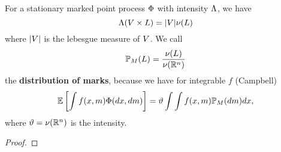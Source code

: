 \begin{lemma}[Campbell]\label{lem: Campbell}
	For a stationary marked point process \(\Phi\) with intensity
	\(\Lambda\), we have	
	\[
		\Lambda(V \times L) = |V|\nu(L)
	\]
	where \(|V|\) is the lebesgue measure of \(V\). We call
	\[
		\mathbb{P}_M(L) = \frac{\nu(L)}{\nu(\mathbb{R}^n)}
	\]
	the \textbf{distribution of marks}, because we have for integrable \(f\)
	(Campbell)
	\[
		\mathbb{E}\left[\int f(x,m) \Phi(dx,dm)\right]
		= \vartheta \int \int f(x,m) \mathbb{P}_M(dm) dx,
	\]
	where \(\vartheta=\nu(\mathbb{R}^n)\) is the intensity.
\end{lemma}

\begin{proof}
\end{proof}
